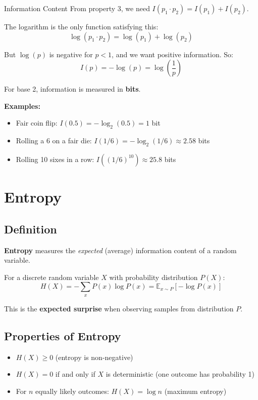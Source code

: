 \begin{derivation}{Information Content}
From property 3, we need $I(p_1 \cdot p_2) = I(p_1) + I(p_2)$.

The logarithm is the only function satisfying this:
\[
\log(p_1 \cdot p_2) = \log(p_1) + \log(p_2)
\]

But $\log(p)$ is negative for $p < 1$, and we want positive information. So:
\[
\boxed{I(p) = -\log(p) = \log\left(\frac{1}{p}\right)}
\]

For base 2, information is measured in \textbf{bits}.
\end{derivation}

\textbf{Examples:}
\begin{itemize}
    \item Fair coin flip: $I(0.5) = -\log_2(0.5) = 1$ bit
    \item Rolling a 6 on a fair die: $I(1/6) = -\log_2(1/6) \approx 2.58$ bits
    \item Rolling 10 sixes in a row: $I((1/6)^{10}) \approx 25.8$ bits
\end{itemize}

\section{Entropy}

\subsection{Definition}

\textbf{Entropy} measures the \textit{expected} (average) information content of a random variable.

\begin{definition}[Entropy]
For a discrete random variable $X$ with probability distribution $P(X)$:
\[
\boxed{H(X) = -\sum_{x} P(x) \log P(x) = \mathbb{E}_{x \sim P}[-\log P(x)]}
\]
\end{definition}

This is the \textbf{expected surprise} when observing samples from distribution $P$.

\subsection{Properties of Entropy}

\begin{itemize}
    \item $H(X) \geq 0$ (entropy is non-negative)
    \item $H(X) = 0$ if and only if $X$ is deterministic (one outcome has probability 1)
    \item For $n$ equally likely outcomes: $H(X) = \log n$ (maximum entropy)
\end{itemize}

